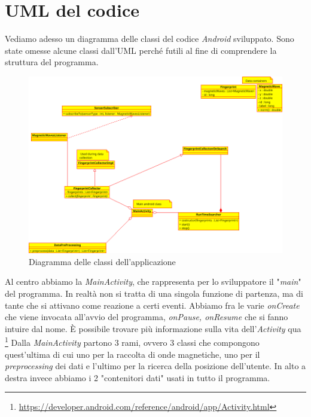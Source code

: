 \section{UML del codice}
Vediamo adesso un diagramma delle classi del codice \textit{Android} sviluppato. Sono state omesse alcune classi dall'UML perch\'e futili al fine di comprendere la struttura del programma.

\begin{figure}[H]
	\centering
	\includegraphics[width=1\linewidth]{img/class_diagram}
	\caption{Diagramma delle classi dell'applicazione}
	\label{fig:classdiagram}
\end{figure}

Al centro abbiamo la \textit{MainActivity}, che rappresenta per lo sviluppatore il "\textit{main}" del programma. In realt\`a non si tratta di una singola funzione di partenza, ma di tante che si attivano come reazione a certi eventi. Abbiamo fra le varie \textit{onCreate} che viene invocata all'avvio del programma, \textit{onPause, onResume} che si fanno intuire dal nome. \`E possibile trovare pi\`u informazione sulla vita dell'\textit{Activity} qua \footnote{\url{https://developer.android.com/reference/android/app/Activity.html}}
Dalla \textit{MainActivity} partono 3 rami, ovvero 3 classi che compongono quest'ultima di cui uno per la raccolta di onde magnetiche, uno per il \textit{preprocessing} dei dati e l'ultimo per la ricerca della posizione dell'utente. In alto a destra invece abbiamo i 2 "contenitori dati" usati in tutto il programma.

